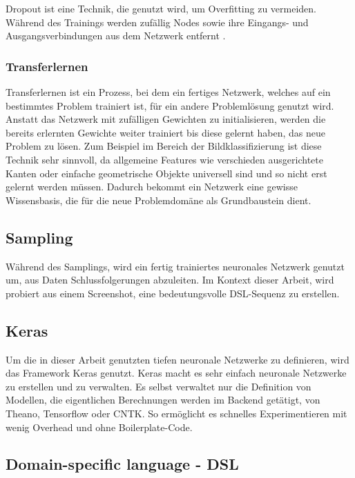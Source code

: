 \documentclass[pdftex,a4paper,halfparskip, article]{scrartcl}
\begin{document}
Dropout ist eine Technik, die genutzt wird, um Overfitting zu vermeiden. Während des Trainings werden zufällig Nodes sowie ihre Eingangs- und Ausgangsverbindungen aus dem Netzwerk entfernt \cite{JMLR:v15:srivastava14a}.

\subsubsection{Transferlernen}

Transferlernen ist ein Prozess, bei dem ein fertiges Netzwerk, welches auf ein bestimmtes Problem trainiert ist, für ein andere Problemlösung genutzt wird. Anstatt das Netzwerk mit zufälligen Gewichten zu initialisieren, werden die bereits erlernten Gewichte weiter trainiert bis diese gelernt haben, das neue Problem zu lösen. Zum Beispiel im Bereich der Bildklassifizierung ist diese Technik sehr sinnvoll, da allgemeine Features wie verschieden ausgerichtete Kanten oder einfache geometrische Objekte universell sind und so nicht erst gelernt werden müssen. Dadurch bekommt ein Netzwerk eine gewisse Wissensbasis, die für die neue Problemdomäne als Grundbaustein dient.

\subsection{Sampling}
Während des Samplings, wird ein fertig trainiertes neuronales Netzwerk genutzt um, aus Daten Schlussfolgerungen abzuleiten. Im Kontext dieser Arbeit, wird probiert aus einem Screenshot, eine bedeutungsvolle DSL-Sequenz zu erstellen.

\subsection{Keras}
Um die in dieser Arbeit genutzten tiefen neuronale Netzwerke zu definieren, wird das Framework Keras \cite{chollet2015keras} genutzt. Keras macht es sehr einfach neuronale Netzwerke zu erstellen und zu verwalten. Es selbst verwaltet nur die Definition von Modellen, die eigentlichen Berechnungen werden im Backend getätigt, von Theano, Tensorflow oder CNTK. So ermöglicht es schnelles Experimentieren mit wenig Overhead und ohne Boilerplate-Code. 

\subsection{Domain-specific language - DSL}
\end{document}
